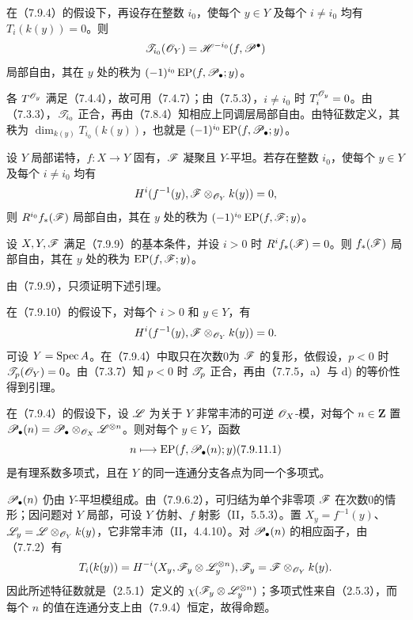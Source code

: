 在（7.9.4）的假设下，再设存在整数 $i_0$，使每个 $y\in Y$ 及每个 $i\ne i_0$ 均有 $T_i(k(y))=0$。则
\[
 \mathscr T_{i_0}(\mathscr O_Y)=\mathscr H^{-i_0}(f,\mathscr P^\bullet)
\]
局部自由，其在 $y$ 处的秩为 $(-1)^{i_0}\operatorname{EP}(f,\mathscr P_\bullet;y)$。

各 $T^{\mathscr O_y}$ 满足（7.4.4），故可用（7.4.7）；由（7.5.3），$i\ne i_0$ 时 $T_i^{\mathscr O_y}=0$。由（7.3.3），$\mathscr T_{i_0}$ 正合，再由（7.8.4）知相应上同调层局部自由。由特征数定义，其秩为 $\dim_{k(y)}T_{i_0}(k(y))$，也就是 $(-1)^{i_0}\operatorname{EP}(f,\mathscr P_\bullet;y)$。

设 $Y$ 局部诺特，$f:X\to Y$ 固有，$\mathscr F$ 凝聚且 $Y$-平坦。若存在整数 $i_0$，使每个 $y\in Y$ 及每个 $i\ne i_0$ 均有
\[
 H^i(f^{-1}(y),\mathscr F\otimes_{\mathscr O_Y}k(y))=0,
\]
则 $R^{i_0}f_*(\mathscr F)$ 局部自由，其在 $y$ 处的秩为 $(-1)^{i_0}\operatorname{EP}(f,\mathscr F;y)$。

设 $X,Y,\mathscr F$ 满足（7.9.9）的基本条件，并设 $i>0$ 时 $R^if_*(\mathscr F)=0$。则 $f_*(\mathscr F)$ 局部自由，其在 $y$ 处的秩为 $\operatorname{EP}(f,\mathscr F;y)$。

由（7.9.9），只须证明下述引理。

在（7.9.10）的假设下，对每个 $i>0$ 和 $y\in Y$，有
\[
 H^i(f^{-1}(y),\mathscr F\otimes_{\mathscr O_Y}k(y))=0.
\]
可设 $Y=\operatorname{Spec} A$。在（7.9.4）中取只在次数0为 $\mathscr F$ 的复形，依假设，$p<0$ 时 $\mathscr T_p(\mathscr O_Y)=0$。由（7.3.7）知 $p<0$ 时 $\mathscr T_p$ 正合，再由（7.7.5，a）与 d) 的等价性得到引理。

在（7.9.4）的假设下，设 $\mathscr L$ 为关于 $Y$ 非常丰沛的可逆 $\mathscr O_X$-模，对每个 $n\in\mathbf Z$ 置 $\mathscr P_\bullet(n)=\mathscr P_\bullet\otimes_{\mathscr O_X}\mathscr L^{\otimes n}$。则对每个 $y\in Y$，函数
\begin{equation}
 n\longmapsto\operatorname{EP}(f,\PP_\bullet(n);y)\tag{7.9.11.1}
\end{equation}
是有理系数多项式，且在 $Y$ 的同一连通分支各点为同一个多项式。

$\mathscr P_\bullet(n)$ 仍由 $Y$-平坦模组成。由（7.9.6.2），可归结为单个非零项 $\mathscr F$ 在次数0的情形；因问题对 $Y$ 局部，可设 $Y$ 仿射、$f$ 射影（II，5.5.3）。置 $X_y=f^{-1}(y)$、$\mathscr L_y=\mathscr L\otimes_{\mathscr O_Y}k(y)$，它非常丰沛（II，4.4.10）。对 $\mathscr P_\bullet(n)$ 的相应函子，由（7.7.2）有
\[
 T_i(k(y))=H^{-i}(X_y,\mathscr F_y\otimes\mathscr L_y^{\otimes n}),
 \mathscr F_y=\mathscr F\otimes_{\mathscr O_Y}k(y).
\]
因此所述特征数就是（2.5.1）定义的 $\chi(\mathscr F_y\otimes\mathscr L_y^{\otimes n})$；多项式性来自（2.5.3），而每个 $n$ 的值在连通分支上由（7.9.4）恒定，故得命题。

